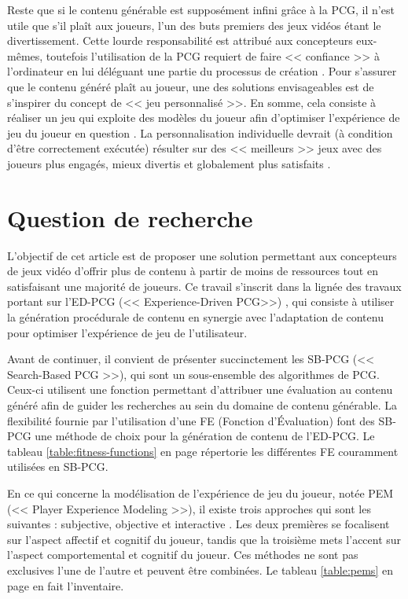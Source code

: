 \documentclass[a4paper,11pt]{article}
\begin{document}
      Reste que si le contenu générable est supposément infini grâce à la PCG, il n'est utile que s'il plaît aux joueurs, l'un des buts premiers des jeux vidéos étant le divertissement.
      Cette lourde responsabilité est attribué aux concepteurs eux-mêmes, toutefois l'utilisation de la PCG requiert de faire << confiance >> à l'ordinateur en lui déléguant une partie du processus de création \cite{Riedl}.  
      Pour s'assurer que le contenu généré plaît au joueur, une des solutions envisageables est de s'inspirer du concept de << jeu personnalisé >>.
      En somme, cela consiste à réaliser un jeu qui exploite des modèles du joueur afin d'optimiser l'expérience de jeu du joueur en question \cite{Bakkes}.
      La personnalisation individuelle devrait (à condition d'être correctement exécutée) résulter sur des << meilleurs >> jeux avec des joueurs plus engagés, mieux divertis et globalement plus satisfaits \cite{Bakkes}.
      
    \section{Question de recherche}

      L'objectif de cet article est de proposer une solution permettant aux concepteurs de jeux vidéo d'offrir plus de contenu à partir de moins de ressources tout en satisfaisant une majorité de joueurs.
      Ce travail s'inscrit dans la lignée des travaux portant sur l'ED-PCG (<< Experience-Driven PCG>>) \cite{Yannakakis}, qui consiste à utiliser la génération procédurale de contenu en synergie avec l'adaptation de contenu pour optimiser l'expérience de jeu de l'utilisateur.
      
      Avant de continuer, il convient de présenter succinctement les SB-PCG (<< Search-Based PCG >>), qui sont un sous-ensemble des algorithmes de PCG. 
      Ceux-ci utilisent une fonction permettant d'attribuer une évaluation au contenu généré afin de guider les recherches au sein du domaine de contenu générable.
      La flexibilité fournie par l'utilisation d'une FE (Fonction d'Évaluation) font des SB-PCG une méthode de choix pour la génération de contenu de l'ED-PCG. 
      Le tableau \ref{table:fitness-functions} en page \pageref{table:fitness-functions} répertorie les différentes FE couramment utilisées en SB-PCG. 
      
      En ce qui concerne la modélisation de l'expérience de jeu du joueur, notée PEM (<< Player Experience Modeling >>), il existe trois approches qui sont les suivantes : subjective, objective et interactive \cite{Yannakakis}.
      Les deux premières se focalisent sur l'aspect affectif et cognitif du joueur, tandis que la troisième mets l'accent sur l'aspect comportemental et cognitif du joueur.
      Ces méthodes ne sont pas exclusives l'une de l'autre et peuvent être combinées.      
      Le tableau \ref{table:pems} en page \pageref{table:pems} en fait l'inventaire. 
      
\end{document}
